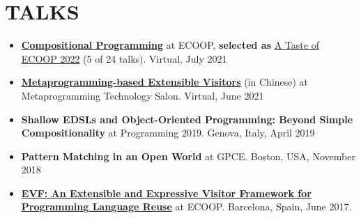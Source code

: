\documentclass[paper=letter,fontsize=11pt]{scrartcl} %
\newcommand{\NewPart}[2]{\section*{\uppercase{#1} #2}}
\begin{document}
\NewPart{Talks}{}
\begin{itemize}
\item \href{https://www.youtube.com/watch?v=fBlHIXWIPhw}{\textbf{Compositional Programming}} at ECOOP, \textbf{selected as} \href{https://2021.ecoop.org/track/ecoop-2021-ecoop-research-papers#event-overview}{A Taste of ECOOP 2022} (5 of 24 talks). Virtual, July 2021
\item \href{https://www.bilibili.com/s/video/BV1Cy4y1M7xC}{\textbf{Metaprogramming-based Extensible Visitors}} (in Chinese) at Metaprogramming Technology Salon. Virtual, June 2021
\item \textbf{Shallow EDSLs and Object-Oriented Programming: Beyond Simple Compositionality} at Programming 2019. Genova, Italy, April 2019
\item \textbf{Pattern Matching in an Open World} at GPCE. Boston, USA, November 2018
\item \href{https://www.youtube.com/watch?v=ibGaxqNNfrs}{\textbf{EVF: An Extensible and Expressive Visitor Framework for Programming Language Reuse}} at ECOOP. Barcelona, Spain, June 2017.
\end{itemize}
\end{document}
